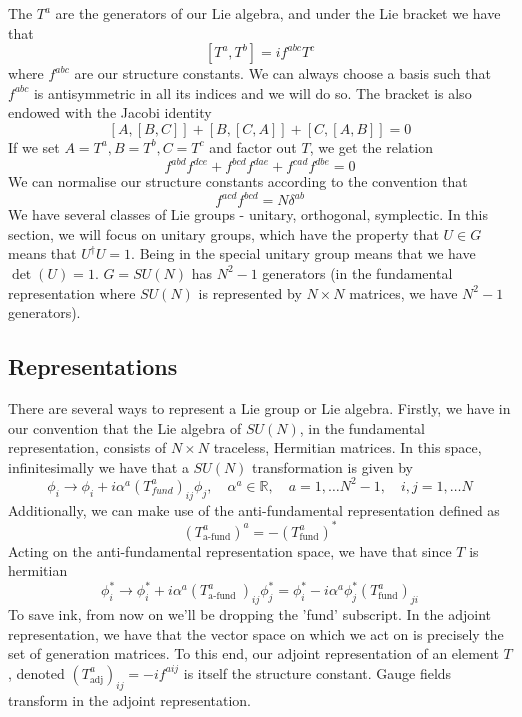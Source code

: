 \documentclass[11pt, oneside]{article}   	%
\theoremstyle{slanted}
\begin{document}
The $ T ^ a $ are the generators 
of our Lie algebra, and under the Lie bracket we have 
that 
\[
	\left[  T ^ a, T ^ b  \right]   = i f ^{ ab c } T ^ c  
\] where $ f ^{ ab c } $ are our structure constants. 
We can always choose a basis such that $ f ^{ abc } $ is antisymmetric 
in all its indices and we will do so. The 
bracket is also endowed with the Jacobi identity
\[
 \left[  A, \left[ B , C  \right]    \right] + \left[  B , \left[  C, A  \right]   \right]  
 + \left[  C , \left[  A, B  \right]    \right]   = 0 
\] If we set $ A  = T ^ a, B  = T ^ b , C = T ^ c $
and factor out $ T  $, we get the 
relation 
\[
	f ^{ ab d } f ^{ dce } + f ^{ bcd }  f ^{ dae  } + f ^{ cad } f ^{ db e }  = 0 
\] We can normalise our structure 
constants according to 
the convention that 
\[
 f ^{ acd } f ^{ b cd  } = N \delta ^{ ab } 
\] We have several classes 
of Lie groups - unitary, orthogonal, 
symplectic. In this section, we 
will focus on unitary groups, which have the property that 
$ U \in G $ means that $ U ^\dagger U = 1  $. 
Being in the special unitary group 
means that we have $ \det \left( U   \right)  = 1 $. 
$ G  = SU \left( N  \right)   $ has $ N ^ 2 - 1  $ generators
(in the fundamental representation where $ SU \left( N  \right)  $  
is represented by $ N \times N $ matrices, we have $ N ^ 2  -1  $ generators). 

\subsection{Representations}
There are several ways to represent 
a Lie group or Lie algebra. 
Firstly, we have in our convention 
that the Lie algebra of $SU \left( N  \right)  $, in the fundamental representation, consists 
of $ N \times N $ traceless, Hermitian matrices. 
In this space, infinitesimally we have that 
a $ SU \left( N  \right)  $ transformation is given by 
\[
 \phi _ i  \to \phi _ i  + i \alpha ^ a \left( T ^ a _{fund}   \right) _{ ij } 
 \phi _ j , \quad \alpha ^ a \in \mathbb{ R } , \quad a  = 1 , \dots N ^ 2 - 1 , 
 \quad i , j  = 1,  \dots N 
\] Additionally, we can 
make use of the anti-fundamental representation 
defined as 
\[
	\left( T_{\text{a-fund}} ^ a  \right)  ^ a  =  -\left( T _{\text{fund}} ^a  \right)  ^ * 
\]
Acting on the anti-fundamental 
representation space, we have that
since $ T $ is hermitian
\[
 \phi ^ * _ i \to \phi _ i ^ * + i \alpha  ^ a \left( T _{\text{a-fund }  }^  a  \right)  _{ ij } \phi _ j ^ * 
  = \phi _ i ^ *  - i \alpha ^ a \phi _ j ^ * \left( T _{\text{fund}} ^ a  \right)_{ji  } 
\] To save ink, from now on we'll be dropping the 
'fund' subscript. 
In the adjoint representation, we have that 
the vector space on which we act on 
is precisely the set of generation matrices. 
To this end, our adjoint representation of an element 
$ T  $, denoted $ \left( T _{\text{adj}} ^ a  \right)_{ ij  }    =  - i f ^{ a ij  } $ 
is itself the structure constant. 
Gauge fields transform in the adjoint representation. 
\end{document}
